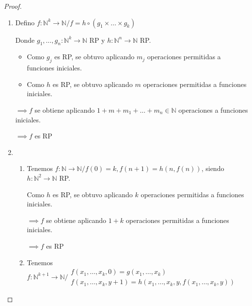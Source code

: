 \begin{proof} \phantom{.}

    \begin{enumerate}
        \item Defino $f: \mathbb{N}^k \to \mathbb{N} / 
        f = h \circ (g_1 \times \dotsc \times g_k)$

        Donde 
        $g_1, \dotsc, g_n: \mathbb{N}^k \to \mathbb{N}$ RP y 
        $h: \mathbb{N}^n \to \mathbb{N}$ RP.

        \begin{itemize}
        \item Como $g_j$ es RP, se obtuvo aplicando $m_j$ operaciones 
        permitidas a funciones iniciales.

        \item Como $h$ es RP, se obtuvo aplicando $m$ operaciones permitidas a
            funciones iniciales.
            
        \end{itemize}

        $\implies f$ se obtiene aplicando $1+m+m_1+\dots + m_n \in \mathbb{N}$
        operaciones a funciones iniciales.
        \begin{center}
            $\implies f$ es RP
        \end{center}

    \item 
        \begin{enumerate}[%
                        labelindent=*,
                        style=multiline,
                        leftmargin=*,
                        align=left,
                        leftmargin=2\parindent,
                        label=Caso \arabic*)]
            \item Tenemos
                $f: \mathbb{N} \to \mathbb{N}/ f(0) = k, f(n+1)=h(n,f(n))$,
                siendo $h: \mathbb{N}^2 \to \mathbb{N}$ RP.

                Como $h$ es RP, se obtuvo aplicando $k$ operaciones permitidas
                a funciones iniciales.

                $\implies f$ se obtiene aplicando $1+k$ operaciones permitidas
                a funciones iniciales.
                \begin{center}
                    $\implies f$ es RP
                \end{center}
            \item Tenemos $f: \mathbb{N}^{k+1} \to \mathbb{N} / \substack{%
                    f(x_1, \dotsc, x_k, 0) = g(x_1, \dotsc, x_k)\\
                    f(x_1, \dotsc, x_k, y+1) = h(x_1, \dotsc, x_k,y, 
                    f(x_1, \dotsc, x_k, y))}$


\end{enumerate}
\end{enumerate}
\end{proof}
